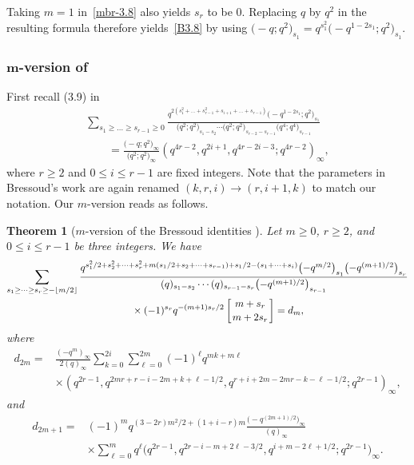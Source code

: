 \documentclass[pdftex]{sigma}
\numberwithin{equation}{section}
\newtheorem{Theorem}{Theorem}[section]
\begin{document}
Taking $m=1$ in~\eqref{mbr-3.8} also yields $s_r$ to be $0$. Replacing $q$ by $q^2$ in the resulting formula therefore yields~\eqref{B3.8} by using
$\bigl(-q;q^2\bigr)_{s_1}=q^{s_1^2}\bigl(-q^{1-2s_{1}};q^2\bigr)_{s_1}$.

\subsubsection[m-version of Ref. 13, equation (3.9)]{$\boldsymbol{m}$-version of \cite[equation (3.9)]{Br80}}
First recall (3.9) in~\cite{Br80}
\begin{gather}
\sum_{s_1\geq\dots\geq s_{r-1}\geq0}\frac{q^{2(s_1^2+\dots+s_{r-1}^2+s_{i+1}+\dots+s_{r-1})}\bigl(-q^{1-2s_{1}};q^2\bigr)_{s_1}}{\bigl(q^2;q^2\bigr)_{s_1-s_2}\cdots
\bigl(q^2;q^2\bigr)_{s_{r-2}-s_{r-1}}\bigl(q^4;q^4\bigr)_{s_{r-1}}}\nonumber\\
\qquad=\frac{\bigl(-q;q^2\bigr)_\infty}{\bigl(q^2;q^2\bigr)_\infty}(q^{4r-2},q^{2i+1},q^{4r-2i-3};q^{4r-2})_\infty,\label{B3.9}
\end{gather}
where $r\geq 2$ and $0\leq i\leq r-1$ are fixed integers. Note that the parameters in Bressoud's work are again renamed $(k,r,i)\to(r,i+1,k)$ to match our notation. Our $m$-version reads as follows.

\begin{Theorem}[$m$-version of the Bressoud identities {\cite[equation (3.9)]{Br80}}]\label{thm:mbr-3.9}
Let $m\geq 0$, $r \geq 2$, and $0 \leq i \leq r-1$ be three integers. We have
\begin{gather}
\sum_{s_1\geq\dots\geq s_{r}\geq-\left\lfloor m/2\right\rfloor}\frac{q^{s_1^2/2+s_2^2+\dots+s_{r}^2+m(s_1/2+s_2+\dots+s_{r-1})+s_1/2-(s_1+\dots+s_{i})}\bigl(-q^{m/2}\bigr)_{s_1} \bigl(-q^{(m+1)/2}\bigr)_{s_{r}}}{(q)_{s_1-s_2}
\cdots(q)_{s_{r-1}-s_{r}}\bigl(-q^{(m+1)/2}\bigr)_{s_{r-1}}}\nonumber\\
\qquad{}\times(-1)^{s_r}q^{-(m+1)s_r/2}\left[{m+s_r\atop m+2s_r}\right]
=d_m,\label{mbr-3.9}
\end{gather}
where
\begin{align*}
d_{2m}={}&\frac{(-q^m)_\infty}{2(q)_\infty}\sum_{k=0}^{2i}\sum_{\ell=0}^{2m}(-1)^\ell q^{mk+m\ell}\\
&\times(q^{2r-1},q^{2mr+r-i-2m+k+\ell-1/2},q^{r+i+2m-2mr-k-\ell-1/2};q^{2r-1})_\infty,
\end{align*}
and
\begin{align*}
d_{2m+1}={}&(-1)^mq^{(3-2r)m^2/2+(1+i-r)m}\frac{\bigl(-q^{(2m+1)/2}\bigr)_\infty}{(q)_\infty}\\
&\times\sum_{\ell=0}^{m}q^{\ell}\bigl(q^{2r-1},q^{2r-i-m+2\ell-3/2},q^{i+m-2\ell+1/2};q^{2r-1}\bigr)_\infty.
\end{align*}
\end{Theorem}
\end{document}
